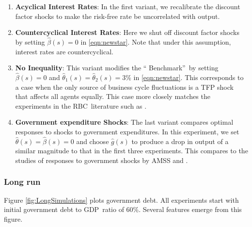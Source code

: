 \documentclass[thmsb,11pt]{article}
\begin{document}
\begin{enumerate}
\item \textbf{Acyclical Interest Rates}: In the first variant, we recalibrate
the discount factor shocks to make the risk-free rate be uncorrelated with
output.

\item \textbf{Countercyclical Interest Rates}: Here we shut off  discount
factor shocks by setting $\hat{\beta}\left( s\right) =0$ in \eqref{eqn:newstar}. Note that under
this assumption, interest rates are countercyclical.

\item \textbf{No Inequality}: This variant modifies the \textquotedblleft
Benchmark\textquotedblright\ by setting $\hat{\beta}\left( s\right) =0$ and $%
{\hat{\theta}}_{1}(s)={\hat{\theta}}_{2}(s)=3\%$ in \eqref{eqn:newstar}. This corresponds to a case
when the only source of business cycle fluctuations is a TFP shock that
affects all agents equally. This case more closely matches the experiments
in the RBC\ literature such as \cite{Chari1994}.

\item \textbf{Government expenditure Shocks}: The last variant compares  optimal
responses to shocks to government expenditures. In this experiment, we set
$\hat{\theta}\left( s\right) =\hat{\beta}\left( s\right) =0$ and choose $%
\hat{g}\left( s\right) $ to produce a drop in output of a similar magnitude
to that in the first three experiments. This compares to the studies of
responses to government shocks by AMSS and \cite{Faraglia2011}.
\end{enumerate}

\subsubsection{Long run}

Figure \ref{fig:LongSimulations} plots government  debt. All
experiments start with initial government debt to GDP\ ratio of 60\%. Several
features emerge from this figure. %

\end{document}
